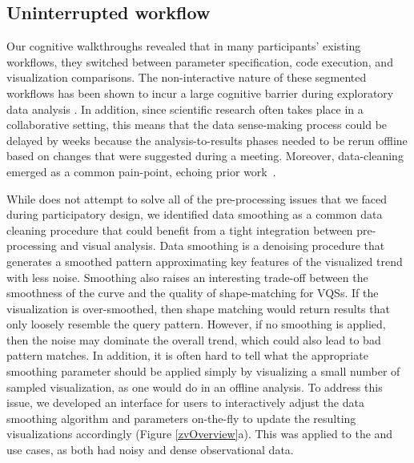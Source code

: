 \subsection{Uninterrupted workflow}
\par Our cognitive walkthroughs revealed that in many participants' existing workflows, they switched between parameter specification, code execution, and visualization comparisons. The non-interactive nature of these segmented workflows has been shown to incur a large cognitive barrier during exploratory data analysis \cite{Kery2017}. In addition, since scientific research often takes place in a collaborative setting, this means that the data sense-making process could be delayed by weeks because the analysis-to-results phases needed to be rerun offline based on changes that were suggested during a meeting. Moreover, data-cleaning emerged as a common pain-point, echoing prior work~\cite{kandel2011wrangler,Kandel2012}.


 While \zv does not attempt to solve all of the pre-processing issues that we faced during participatory design, we identified data smoothing as a common data cleaning procedure that could benefit from a tight integration between pre-processing and visual analysis. Data smoothing is a denoising procedure that generates a smoothed pattern approximating key features of the visualized trend with less noise. Smoothing also raises an interesting trade-off between the smoothness of the curve and the quality of shape-matching for VQSs. If the visualization is over-smoothed, then shape matching would return results that only loosely resemble the query pattern. However, if no smoothing is applied, then the noise may dominate the overall trend, which could also lead to bad pattern matches. In addition, it is often hard to tell what the appropriate smoothing parameter should be applied simply by visualizing a small number of sampled visualization, as one would do in an offline analysis.
\npar To address this issue, we developed an interface for users to interactively adjust the data smoothing algorithm and parameters on-the-fly to update the resulting visualizations accordingly (Figure \ref{zvOverview}a). This was applied to the \matsci and \astro use cases, as both had noisy and dense observational data. 
